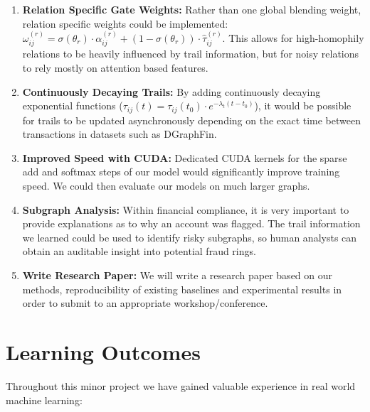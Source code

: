 \begin{enumerate}
    \item \textbf{Relation Specific Gate Weights:}
    Rather than one global blending weight, relation specific weights could be implemented: $\omega_{ij}^{(r)} = \sigma(\theta_r) \cdot \alpha_{ij}^{(r)} + (1 - \sigma(\theta_r)) \cdot \hat{\tau}_{ij}^{(r)}$. This allows for high-homophily relations to be heavily influenced by trail information, but for noisy relations to rely mostly on attention based features.
    \item \textbf{Continuously Decaying Trails:}
    By adding continuously decaying exponential functions ($\tau_{ij}(t) = \tau_{ij}(t_0) \cdot e^{-\lambda_t(t - t_0)}$), it would be possible for trails to be updated asynchronously depending on the exact time between transactions in datasets such as DGraphFin.
    \item \textbf{Improved Speed with CUDA:}
    Dedicated CUDA kernels for the sparse add and softmax steps of our model would significantly improve training speed. We could then evaluate our models on much larger graphs.
    \item \textbf{Subgraph Analysis:}
    Within financial compliance, it is very important to provide explanations as to why an account was flagged. The trail information we learned could be used to identify risky subgraphs, so human analysts can obtain an auditable insight into potential fraud rings.
    \item \textbf{Write Research Paper:}
    We will write a research paper based on our methods, reproducibility of existing baselines and experimental results in order to submit to an appropriate workshop/conference.
\end{enumerate}

\section[Learning Outcomes]{\textbf{Learning Outcomes}}
\label{sec:learning_outcomes}

Throughout this minor project we have gained valuable experience in real world machine learning:

